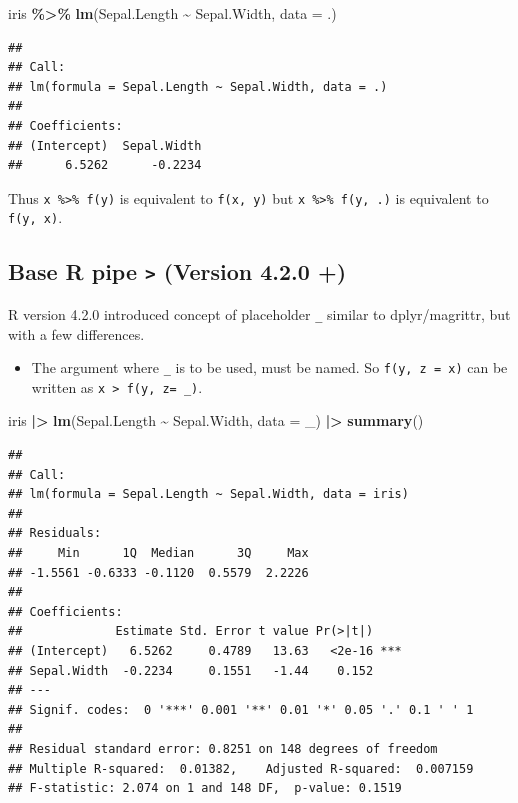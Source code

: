 \documentclass[
]{book}
\newenvironment{Shaded}{\begin{snugshade}}{\end{snugshade}}
\newcommand{\AttributeTok}[1]{\textcolor[rgb]{0.13,0.29,0.53}{#1}}
\newcommand{\FunctionTok}[1]{\textcolor[rgb]{0.13,0.29,0.53}{\textbf{#1}}}
\newcommand{\NormalTok}[1]{#1}
\newcommand{\SpecialCharTok}[1]{\textcolor[rgb]{0.81,0.36,0.00}{\textbf{#1}}}
\providecommand{\tightlist}{%
  \setlength{\itemsep}{0pt}\setlength{\parskip}{0pt}}
\begin{document}
\begin{Shaded}
\begin{Highlighting}[]
\NormalTok{iris }\SpecialCharTok{\%\textgreater{}\%} \FunctionTok{lm}\NormalTok{(Sepal.Length }\SpecialCharTok{\textasciitilde{}}\NormalTok{ Sepal.Width, }\AttributeTok{data =}\NormalTok{ .)}
\end{Highlighting}
\end{Shaded}

\begin{verbatim}
## 
## Call:
## lm(formula = Sepal.Length ~ Sepal.Width, data = .)
## 
## Coefficients:
## (Intercept)  Sepal.Width  
##      6.5262      -0.2234
\end{verbatim}

Thus \texttt{x\ \%\textgreater{}\%\ f(y)} is equivalent to \texttt{f(x,\ y)} but \texttt{x\ \%\textgreater{}\%\ f(y,\ .)} is equivalent to \texttt{f(y,\ x)}.

\hypertarget{base-r-pipe-version-4.2.0}{%
\subsection{\texorpdfstring{Base R pipe \texttt{\textbar{}\textgreater{}} (Version 4.2.0 +)}{Base R pipe \textbar\textgreater{} (Version 4.2.0 +)}}\label{base-r-pipe-version-4.2.0}}

R version 4.2.0 introduced concept of placeholder \texttt{\_} similar to dplyr/magrittr, but with a few differences.

\begin{itemize}
\tightlist
\item
  The argument where \texttt{\_} is to be used, must be named. So \texttt{f(y,\ z\ =\ x)} can be written as \texttt{x\ \textbar{}\textgreater{}\ f(y,\ z=\ \_)}.
\end{itemize}

\begin{Shaded}
\begin{Highlighting}[]
\NormalTok{iris }\SpecialCharTok{|\textgreater{}} \FunctionTok{lm}\NormalTok{(Sepal.Length }\SpecialCharTok{\textasciitilde{}}\NormalTok{ Sepal.Width, }\AttributeTok{data =}\NormalTok{ \_) }\SpecialCharTok{|\textgreater{}} \FunctionTok{summary}\NormalTok{()}
\end{Highlighting}
\end{Shaded}

\begin{verbatim}
## 
## Call:
## lm(formula = Sepal.Length ~ Sepal.Width, data = iris)
## 
## Residuals:
##     Min      1Q  Median      3Q     Max 
## -1.5561 -0.6333 -0.1120  0.5579  2.2226 
## 
## Coefficients:
##             Estimate Std. Error t value Pr(>|t|)    
## (Intercept)   6.5262     0.4789   13.63   <2e-16 ***
## Sepal.Width  -0.2234     0.1551   -1.44    0.152    
## ---
## Signif. codes:  0 '***' 0.001 '**' 0.01 '*' 0.05 '.' 0.1 ' ' 1
## 
## Residual standard error: 0.8251 on 148 degrees of freedom
## Multiple R-squared:  0.01382,    Adjusted R-squared:  0.007159 
## F-statistic: 2.074 on 1 and 148 DF,  p-value: 0.1519
\end{verbatim}
\end{document}
